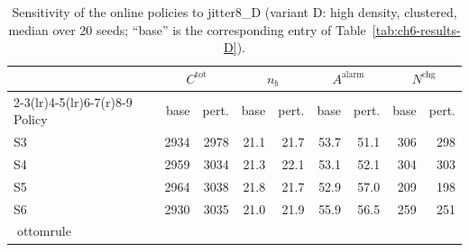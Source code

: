 \begin{table}[htbp]
\centering
\caption{Sensitivity of the online policies to jitter8_D (variant D: high density, clustered,
median over 20 seeds; ``base'' is the corresponding entry of
Table~\ref{tab:ch6-results-D}).}
\label{tab:ch6-sens-D-jitter8}
\footnotesize
\begin{tabular}{@{}l rr rr rr rr@{}}
\toprule
& \multicolumn{2}{c}{$C^{\mathrm{tot}}$} & \multicolumn{2}{c}{$n_b$}
  & \multicolumn{2}{c}{$A^{\mathrm{alarm}}$} & \multicolumn{2}{c}{$N^{\mathrm{chg}}$} \\
\cmidrule(r){2-3}\cmidrule(lr){4-5}\cmidrule(lr){6-7}\cmidrule(r){8-9}
Policy & base & pert. & base & pert. & base & pert. & base & pert. \\
\midrule

S3 & 2934 & 2978 & 21.1 & 21.7 & 53.7 & 51.1 & 306 & 298 \\
S4 & 2959 & 3034 & 21.3 & 22.1 & 53.1 & 52.1 & 304 & 303 \\
S5 & 2964 & 3038 & 21.8 & 21.7 & 52.9 & 57.0 & 209 & 198 \\
S6 & 2930 & 3035 & 21.0 & 21.9 & 55.9 & 56.5 & 259 & 251 \\
ottomrule
\end{tabular}
\end{table}
